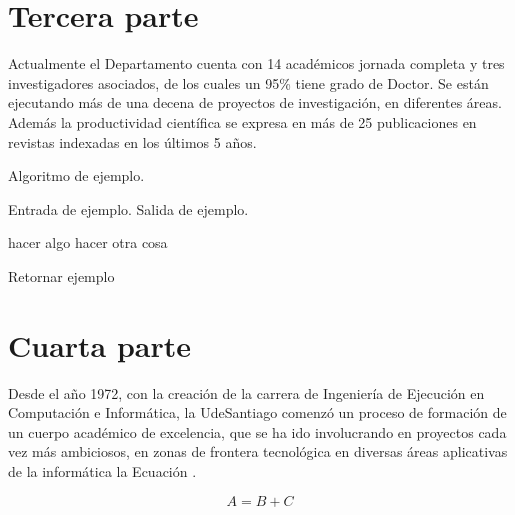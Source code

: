 \section{Tercera parte}
\label{sec:tercera}
Actualmente el Departamento cuenta con 14 académicos jornada completa y tres investigadores asociados, de los cuales un 95\% tiene grado de Doctor. Se están ejecutando más de una decena de proyectos de investigación, en diferentes áreas. Además la productividad científica se expresa en más de 25 publicaciones en revistas indexadas en los últimos 5 años.

\begin{algorithm}[!ht]
	\caption{Algoritmo de ejemplo.}
	\label{alg:ejemplo}
	\begin{algorithmic}[1]
	\REQUIRE Entrada de ejemplo.
	\ENSURE Salida de ejemplo.	
	
		\STATE hacer algo
	\ELSE
		\STATE hacer otra cosa
	\ENDIF
	
	\RETURN Retornar ejemplo
	
	\end{algorithmic}
\end{algorithm}

\section{Cuarta parte}
\label{sec:cuarta}
Desde el año 1972, con la creación de la carrera de Ingeniería de Ejecución en Computación e Informática, la UdeSantiago comenzó un proceso  de formación de un cuerpo académico de excelencia, que se ha ido involucrando en proyectos cada vez más ambiciosos, en zonas de frontera tecnológica en diversas áreas aplicativas de la informática la Ecuación .

\begin{equation}
	A = B + C
\label{eq:ejemplo}
\end{equation}
